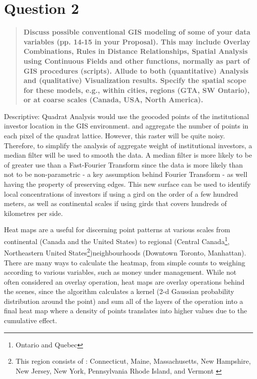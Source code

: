 \documentclass[12pt,letterpaper,notitlepage,onecolumn,final,openbib]{article}
\begin{document}
\section{Question 2}
\begin{quotation}
\textbf{Discuss possible conventional GIS modeling of some of your data variables (pp. 14-15 in your Proposal). This may include Overlay Combinations, Rules in Distance Relationships, Spatial Analysis using Continuous Fields and other functions, normally as part of GIS procedures (scripts). Allude to both (quantitative) Analysis and (qualitative) Visualization results. Specify the spatial scope for these models, e.g., within cities, regions (GTA, SW Ontario), or at coarse scales (Canada, USA, North America).}
\end{quotation}

Descriptive:
Quadrat Analysis would use the geocoded points of the institutional investor location in the GIS environment. and aggregate the number of points in each pixel of the quadrat lattice.  However, this raster will be quite noisy.  Therefore, to simplify the analysis of aggregate weight of institutional investors, a median filter will be used to smooth the data.  A median filter is more likely to be of greater use than a Fast-Fourier Transform since the data is more likely than not to be non-parametric - a key assumption behind Fourier Transform - as well having the property of preserving edges.  This new surface can be used to identify local concentrations of investors if using a gird on the order of a few hundred meters, as well as continental scales if using girds that covers hundreds of kilometres per side.   


Heat maps are a useful for discerning point patterns at various scales from continental (Canada and the United States) to regional (Central Canada\footnote{Ontario and Quebec}, Northeastern United States\footnote{This region consists of : Connecticut, Maine, Massachusetts, New Hampshire, New Jersey, New York, Pennsylvania Rhode Island, and Vermont \cite{Census2010_div}})neighbourhoods (Downtown Toronto, Manhattan).  There are many ways to calculate the heatmap, from simple counts to weighing according to various variables, such as money under management.   While not often considered an overlay operation, heat maps are overlay operations behind the scenes, since the algorithm calculates a kernel (2-d Gaussian probability distribution around the point) and sum all of the layers of the operation into a final heat map where a density of points translates into higher values due to the cumulative effect.  
\end{document}
